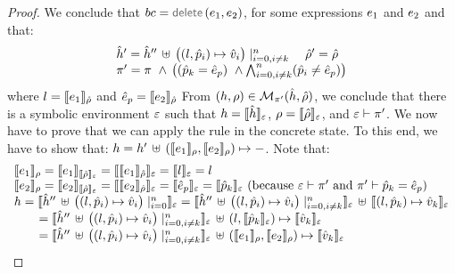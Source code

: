 \begin{proof}
\noindent{}
We conclude that $\bcmd = \jsildelete(\jsilexpr_1, \jsilexpr_2)$, for some expressions $\jsilexpr_1$ and $\jsilexpr_2$
and that: 
$$
\begin{array}{l}
\sheap' = \sheap'' \, \uplus \,  \big((\loc, \sexprp_i) \mapsto \sexprv_i\big)\mid_{i = 0, i \neq k}^n
\quad 
\sstore' = \sstore
\\ 
 \pc' = \pc \ \wedge \, \big( (\sexprp_k = \sexpr_p) \ \wedge \bigwedge_{i = 0, i \neq k}^n (\sexprp_i \neq \sexpr_p) \big)
\end{array}
$$
where $\loc = \symbeval{\jsilexpr_1}{\sstore}$ and $\sexpr_p = \symbeval{\jsilexpr_2}{\sstore}$
From $(\heap, \store) \in \smodels{\sheap, \sstore}{\pc'}$, we conclude that there is a symbolic environment
$\senv$ such that $\heap = \semexpr{\sheap}{\senv}$, $\store = \semexpr{\sstore}{\senv}$, and 
$\senv \vdash \pc'$. 
We now have to prove that we can apply the  rule in the concrete state.
To this end, we have to show that:
$\heap = \heap' \dunion \hcell{\symbeval{\jsilexpr_1}{\store}}{\symbeval{\jsilexpr_2}{\store}}{-}$. 
Note that: 
$$
\begin{array}{l}
%
 \symbeval{\jsilexpr_1}{\store} = \symbeval{\jsilexpr_1}{\symbeval{\sstore}{\senv}} = \symbeval{\symbeval{\jsilexpr_1}{\sstore}}{\senv} 
    = \symbeval{\loc}{\senv} = \loc \\ 
  \symbeval{\jsilexpr_2}{\store}  = \symbeval{\jsilexpr_2}{\semexpr{\sstore}{\senv}} =  \symbeval{\symbeval{\jsilexpr_2}{\sstore}}{\senv}
   =  \symbeval{\sexpr_p}{\senv} = \symbeval{\sexprp_k}{\senv}  \text{ (because $\senv \vdash \pc'$ and $\pc' \vdash \sexprp_k = \sexpr_p$)} \\
 \heap = \semexpr{\sheap'' \, \uplus \, \big((l, \sexprp_i) \mapsto \sexprv_i\big)\mid_{i = 0}^n}{\senv} 
       =  \semexpr{\sheap'' \, \uplus \, \big((l, \sexprp_i) \mapsto \sexprv_i\big)\mid_{i = 0, i \neq k}^n}{\senv} \dunion \semexpr{(l, \sexprp_k) \mapsto \sexprv_k}{\senv} \\
         \qquad = \semexpr{\sheap'' \, \uplus \, \big((l, \sexprp_i) \mapsto \sexprv_i\big)\mid_{i = 0, i \neq k}^n}{\senv} \dunion (l, \semexpr{\sexprp_k}{\senv}) \mapsto \semexpr{\sexprv_k}{\senv}  \\ 
         \qquad =  \semexpr{\sheap'' \, \uplus \, \big((l, \sexprp_i) \mapsto \sexprv_i\big)\mid_{i = 0, i \neq k}^n}{\senv} \dunion (\symbeval{\jsilexpr_1}{\store}, \symbeval{\jsilexpr_2}{\store}) \mapsto \semexpr{\sexprv_k}{\senv} \\ 

\end{array}$$
\end{proof}
